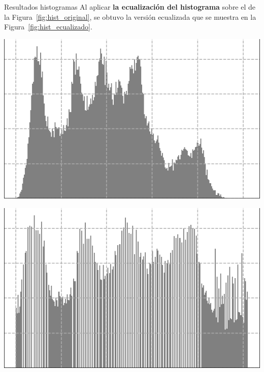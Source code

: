 \documentclass{beamer}
\begin{document}
\begin{frame}[fragile]{Resultados histogramas}
	\justifying
	Al aplicar \textcolor{unahurverde}{\textbf{la ecualización del histograma}} sobre el de la Figura~\ref{fig:hist_original}, 
	se obtuvo la versión ecualizada que se muestra en la Figura~\ref{fig:hist_ecualizado}.
	\vspace{0.5cm}
	
	\centering
	\begin{minipage}{0.45\linewidth}
		\centering
		\includegraphics[width=\linewidth]{../results/lena_hist_gris}
		\label{fig:hist_original}
	\end{minipage}\hfill
	\begin{minipage}{0.45\linewidth}
		\centering
		\includegraphics[width=\linewidth]{../results/lena_hist_gris_ecualizado}
		\label{fig:hist_ecualizado}
	\end{minipage}
\end{frame}
\end{document}
